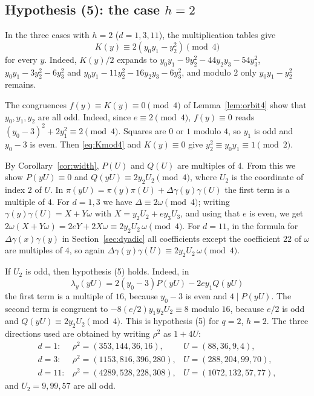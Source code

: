 \documentclass[a4paper,11pt]{article}
\theoremstyle{plain}
\theoremstyle{definition}
\theoremstyle{remark}
\numberwithin{equation}{section}
\numberwithin{table}{section}
\newcommand{\tsec}[2]{\texorpdfstring{#1}{#2}}
\begin{document}
\subsection{Hypothesis (5): the case \tsec{$h=2$}{h=2}}\label{sec:hyp5a}

In the three cases with $h=2$ ($d=1,3,11$), the multiplication tables give
\begin{equation}\label{eq:Kmod4}
K(y)\equiv2(y_0y_1-y_2^2)\pmod4
\end{equation}
for every $y$.
Indeed, $K(y)/2$ expands to $y_0y_1-9y_2^2-44y_2y_3-54y_3^2$, $y_0y_1-3y_2^2-6y_3^2$ and $y_0y_1-11y_2^2-16y_2y_3-6y_3^2$, and modulo $2$ only $y_0y_1-y_2^2$ remains.

The congruences $f(y)\equiv K(y)\equiv0\pmod4$ of Lemma~\ref{lem:orbit4} show that $y_0,y_1,y_2$ are all odd.
Indeed, since $e\equiv2\pmod4$, $f(y)\equiv0$ reads $(y_0-3)^2+2y_1^2\equiv2\pmod4$.
Squares are $0$ or $1$ modulo $4$, so $y_1$ is odd and $y_0-3$ is even.
Then \eqref{eq:Kmod4} and $K(y)\equiv0$ give $y_2^2\equiv y_0y_1\equiv1\pmod2$.

By Corollary~\ref{cor:width}, $P(U)$ and $Q(U)$ are multiples of $4$.
From this we show $P(yU)\equiv0$ and $Q(yU)\equiv2y_2U_2\pmod4$, where $U_2$ is the coordinate of index $2$ of $U$.
In $\pi(yU)=\pi(y)\pi(U)+\Delta\gamma(y)\gamma(U)$ the first term is a multiple of $4$.
For $d=1,3$ we have $\Delta\equiv2\omega\pmod4$; writing $\gamma(y)\gamma(U)=X+Y\omega$ with $X=y_2U_2+ey_3U_3$, and using that $e$ is even, we get $2\omega(X+Y\omega)=2eY+2X\omega\equiv2y_2U_2\,\omega\pmod4$.
For $d=11$, in the formula for $\Delta\gamma(x)\gamma(y)$ in Section~\ref{sec:dyadic} all coefficients except the coefficient $22$ of $\omega$ are multiples of $4$, so again $\Delta\gamma(y)\gamma(U)\equiv2y_2U_2\,\omega\pmod4$.

If $U_2$ is odd, then hypothesis (5) holds. Indeed, in
\[
\lambda_y(yU)=2(y_0-3)P(yU)-2ey_1Q(yU)
\]
the first term is a multiple of $16$, because $y_0-3$ is even and $4\mid P(yU)$. The second term is congruent to $-8(e/2)y_1y_2U_2\equiv8$ modulo $16$, because $e/2$ is odd and $Q(yU)\equiv2y_2U_2\pmod4$. This is hypothesis (5) for $q=2$, $h=2$.
The three directions used are obtained by writing $\rho^2$ as $1+4U$:
\[
\begin{array}{lll}
d=1: & \rho^2=(353,144,36,16), & U=(88,36,9,4),\\
d=3: & \rho^2=(1153,816,396,280), & U=(288,204,99,70),\\
d=11: & \rho^2=(4289,528,228,308), & U=(1072,132,57,77),
\end{array}
\]
and $U_2=9,99,57$ are all odd.
\end{document}
